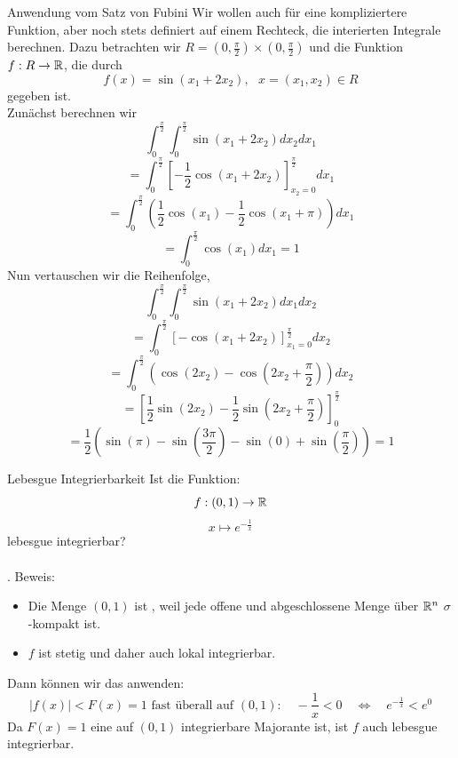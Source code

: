 \begin{Beispiel}{Anwendung vom Satz von Fubini}
Wir wollen auch für eine kompliziertere Funktion, aber noch stets definiert auf einem Rechteck, die interierten Integrale berechnen. Dazu betrachten wir $R=(0,\frac{\pi}{2})\times (0,\frac{\pi}{2})$ und die Funktion $f:R\rightarrow \mathbb{R}$, die durch
$$f(x)=\sin(x_1+2x_2), \mbox{ $x=(x_1,x_2)\in R$}$$
gegeben ist. \\
Zunächst berechnen wir
$$\int_0^{\frac{\pi}{2}}\int_0^{\frac{\pi}{2}} \sin(x_1+2x_2)dx_2dx_1$$
$$=\int_0^{\frac{\pi}{2}}[-\frac{1}{2}\cos(x_1+2x_2)]^{\frac{\pi}{2}}_{x_2=0}dx_1$$
$$=\int_0^{\frac{\pi}{2}}(\frac{1}{2}\cos(x_1)-\frac{1}{2}\cos(x_1+\pi))dx_1$$
$$=\int_0^{\frac{\pi}{2}}\cos(x_1)dx_1 = 1$$
Nun vertauschen wir die Reihenfolge,
$$\int_0^{\frac{\pi}{2}}\int_0^{\frac{\pi}{2}} \sin(x_1+2x_2)dx_1dx_2$$
$$=\int_0^{\frac{\pi}{2}} [-\cos(x_1+2x_2)]^{\frac{\pi}{2}}_{x_1=0}dx_2$$
$$=\int_0^{\frac{\pi}{2}} (\cos(2x_2)-\cos(2x_2+\frac{\pi}{2}))dx_2$$
$$=[\frac{1}{2}\sin(2x_2)-\frac{1}{2}\sin(2x_2+\frac{\pi}{2})]_0^{\frac{\pi}{2}}$$
$$=\frac{1}{2}(\sin(\pi)-\sin(\frac{3\pi}{2})-\sin(0)+\sin(\frac{\pi}{2})) = 1$$
\end{Beispiel}
\begin{Beispiel}{Lebesgue Integrierbarkeit}
    Ist die Funktion:
    $$f: (0,1)\rightarrow \mathbb{R}$$
    $$x\mapsto e^{-\frac{1}{x}}$$
    lebesgue integrierbar? \\ \\
    .  Beweis: \\
    \begin{itemize}
        \item Die Menge $(0,1)$ ist , weil jede offene und abgeschlossene Menge über $\mathbb{R}^n$ $\sigma$-kompakt ist.
        \item $f$ ist stetig und daher auch lokal integrierbar.
    \end{itemize}
    Dann können wir das  anwenden:
    $$|f(x)|<F(x)=1 \mbox{ fast überall auf }(0,1): \quad -\frac{1}{x}<0 \quad \iff \quad e^{-\frac{1}{x}}<e^0$$
Da $F(x)=1$ eine auf $(0,1)$ integrierbare Majorante ist,  ist $f$ auch lebesgue integrierbar.
    
    
\end{Beispiel}
